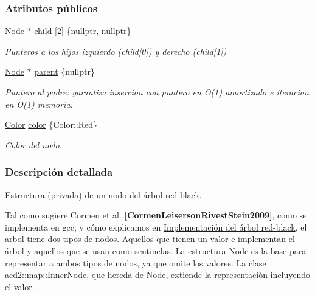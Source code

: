 \subsubsection*{Atributos públicos}
\begin{DoxyCompactItemize}
\item 
\hyperlink{structaed2_1_1iterator_1_1Node}{Node} $\ast$ \hyperlink{structaed2_1_1iterator_1_1Node_aaf0597e2d3402329e0c30db030777f04_aaf0597e2d3402329e0c30db030777f04}{child} \mbox{[}2\mbox{]} \{nullptr, nullptr\}
\begin{DoxyCompactList}\small\item\em Punteros a los hijos izquierdo (child\mbox{[}0\mbox{]}) y derecho (child\mbox{[}1\mbox{]}) \end{DoxyCompactList}\item 
\hyperlink{structaed2_1_1iterator_1_1Node}{Node} $\ast$ \hyperlink{structaed2_1_1iterator_1_1Node_a7f097f76a613a17fc9d03c8f153cb5e4_a7f097f76a613a17fc9d03c8f153cb5e4}{parent} \{nullptr\}
\begin{DoxyCompactList}\small\item\em Puntero al padre\+: garantiza insercion con puntero en O(1) amortizado e iteracion en O(1) memoria. \end{DoxyCompactList}\item 
\hyperlink{classaed2_1_1iterator_aaa188f82ba585d8de525b1400242cf4f_aaa188f82ba585d8de525b1400242cf4f}{Color} \hyperlink{structaed2_1_1iterator_1_1Node_a07d4b83de27938ece64e1a6db4a055cc_a07d4b83de27938ece64e1a6db4a055cc}{color} \{Color\+::\+Red\}
\begin{DoxyCompactList}\small\item\em Color del nodo. \end{DoxyCompactList}\end{DoxyCompactItemize}


\subsubsection{Descripción detallada}
Estructura (privada) de un nodo del árbol red-\/black. 

Tal como sugiere Cormen et al. {\bfseries [Cormen\+Leiserson\+Rivest\+Stein2009]}, como se implementa en gcc, y cómo explicamos en \hyperlink{Implementacion}{Implementación del árbol red-\/black}, el arbol tiene dos tipos de nodos. Aquellos que tienen un valor e implementan el árbol y aquellos que se usan como sentinelas. La estructura \hyperlink{structaed2_1_1iterator_1_1Node}{Node} es la base para representar a ambos tipos de nodos, ya que omite los valores. La clase \hyperlink{structaed2_1_1map_1_1InnerNode}{aed2\+::map\+::\+Inner\+Node}, que hereda de \hyperlink{structaed2_1_1iterator_1_1Node}{Node}, extiende la representación incluyendo el valor.

